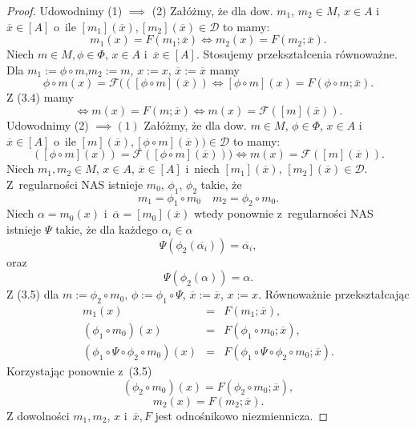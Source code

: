 \documentclass[12pt,a4paper]{report}
\newcommand{\domkniecie}[1]{\left[ {#1} \right] }
\begin{document}
\begin{proof}
Udowodnimy (1) $\implies$ (2)
Załóżmy, że dla dow. $m_{1}$, $ m_{2} \in M$, $x \in A$ i~$\overline{x} \in \domkniecie{A}$ o~ile $\domkniecie{m_1}(\overline{x}), \domkniecie{m_2}(\overline{x})\in \mathcal{D}$ to mamy:
\begin{equation}
 m_{1}(x)=F(m_{1};\overline{x}) \iff m_{2}(x)=F(m_{2};\overline{x}).
\end{equation}
Niech $m\in M, \phi \in \Phi$, $x \in A$ i~$\overline{x}\in \domkniecie{A}$.
Stosujemy przekształcenia równoważne.
Dla $m_1:=\phi\circ m$,$ m_2:=m$, $x:=x$, $\overline{x}:=\overline{x}$ mamy
$$
\phi\circ m(x)=\mathcal{F}((\domkniecie{\phi \circ m}(\overline{x})) \iff \domkniecie{\phi \circ m}(x)=F(\phi \circ m;\overline{x}). 
$$
Z (3.4) mamy
$$
\iff m(x)=F(m;\overline{x}) \iff m(x)=\mathcal{F}(\domkniecie{m}(\overline{x})).
$$
Udowodnimy (2) $\implies (1)$
Załóżmy, że dla dow. $m \in M$, $\phi \in \Phi$, $ x \in A$ i~$\overline{x} \in \domkniecie{A}$ o~ile $\domkniecie{m}(\overline{x}), \domkniecie{\phi\circ m}(\overline{x})) \in \mathcal{D}$ to mamy:
\begin{equation}
(\domkniecie{\phi\circ m}(x))=\mathcal{F}( \domkniecie{\phi \circ m}(\overline{x}))) \iff m(x)=\mathcal{F}(\domkniecie{m}(\overline{x})).
\end{equation}
Niech $m_1,m_2 \in M$, $x \in A$, $\overline{x}\in \domkniecie{A}$ i~niech $\domkniecie{m_1}(\overline{x})$, $\domkniecie{m_2}(\overline{x})\in \mathcal{D}$. Z~regularności NAS istnieje $m_0$, $\phi_1$, $\phi_2$ takie, że
$$ 
m_1=\phi_1\circ m_0 \quad m_2=\phi_2\circ m_0.
$$
Niech $\alpha=m_0(x)$ i~$\overline{\alpha}=\domkniecie{m_0}(\overline{x})$ wtedy ponownie z~regularności NAS istnieje $\Psi$ takie, że dla każdego $\alpha_i \in \alpha$
$$
\Psi(\phi_2(\overline{\alpha_i}))=\overline{\alpha_i},
$$
oraz
$$
\Psi(\phi_2(\alpha))=\alpha.
$$
Z (3.5) dla $m:=\phi_2 \circ m_0$, $\phi:=\phi_1\circ \Psi$, $\overline{x}:=\overline{x}$, $x:=x$.
Równoważnie przekształcając
\begin{eqnarray*}
m_1(x) & = & F(m_1;\overline{x}), \\
 (\phi_1\circ m_0)(x) & = & F(\phi_1 \circ m_0;\overline{x}),\\
(\phi_1\circ\Psi\circ\phi_2\circ m_0)(x)&=&F(\phi_1\circ\Psi\circ\phi_2\circ m_0;\overline{x}). 
\end{eqnarray*}
Korzystając ponownie z~(3.5)
$$
(\phi_2\circ m_0)(x)=F(\phi_2\circ m_0;\overline{x}), 
$$
$$
m_2(x)=F(m_2;\overline{x}).
$$
Z dowolności $m_1, m_2$, $x$ i~$\overline{x}, F$ jest odnośnikowo niezmiennicza.


\end{proof}
\end{document}
